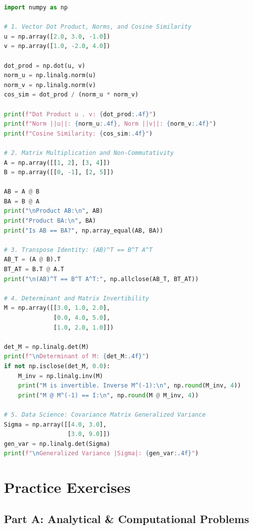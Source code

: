 \begin{lstlisting}[language=Python, caption=Vector and Matrix Operations in NumPy]
import numpy as np

# 1. Vector Dot Product, Norms, and Cosine Similarity
u = np.array([2.0, 3.0, -1.0])
v = np.array([1.0, -2.0, 4.0])

dot_prod = np.dot(u, v)
norm_u = np.linalg.norm(u)
norm_v = np.linalg.norm(v)
cos_sim = dot_prod / (norm_u * norm_v)

print(f"Dot Product u . v: {dot_prod:.4f}")
print(f"Norm ||u||: {norm_u:.4f}, Norm ||v||: {norm_v:.4f}")
print(f"Cosine Similarity: {cos_sim:.4f}")

# 2. Matrix Multiplication and Non-Commutativity
A = np.array([[1, 2], [3, 4]])
B = np.array([[0, -1], [2, 5]])

AB = A @ B
BA = B @ A
print("\nProduct AB:\n", AB)
print("Product BA:\n", BA)
print("Is AB == BA?", np.array_equal(AB, BA))

# 3. Transpose Identity: (AB)^T == B^T A^T
AB_T = (A @ B).T
BT_AT = B.T @ A.T
print("\n(AB)^T == B^T A^T:", np.allclose(AB_T, BT_AT))

# 4. Determinant and Matrix Invertibility
M = np.array([[3.0, 1.0, 2.0],
              [0.0, 4.0, 5.0],
              [1.0, 2.0, 1.0]])

det_M = np.linalg.det(M)
print(f"\nDeterminant of M: {det_M:.4f}")
if not np.isclose(det_M, 0.0):
    M_inv = np.linalg.inv(M)
    print("M is invertible. Inverse M^(-1):\n", np.round(M_inv, 4))
    print("M @ M^(-1) == I:\n", np.round(M @ M_inv, 4))

# 5. Data Science: Covariance Matrix Generalized Variance
Sigma = np.array([[4.0, 3.0],
                  [3.0, 9.0]])
gen_var = np.linalg.det(Sigma)
print(f"\nGeneralized Variance |Sigma|: {gen_var:.4f}")
\end{lstlisting}

\newpage
\section{Practice Exercises}

\subsection*{Part A: Analytical \& Computational Problems}

